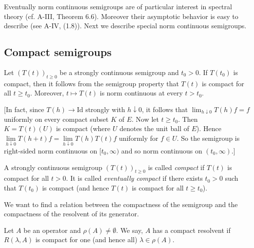 Eventually norm continuous semigroups are of particular interest in spectral theory (cf. A-III, Theorem 6.6).
Moreover their asymptotic behavior is easy to describe (see A-IV, (1.8)).
Next we describe special norm continuous semigroups.
\subsection{Compact semigroups} \label{subsec:a2-1.se7}

Let $(T(t))_{t\geq 0}$ be a strongly continuous semigroup and $t_0 > 0$.
If $T(t_0)$ is compact, then it follows from the semigroup property that $T(t)$ is compact for all $t \geq t_0$.
Moreover, $t \mapsto T(t)$ is norm continuous at every $t > t_0$.

[In fact, since $T(h) \to \text{Id}$ strongly with $h \downarrow 0$, it follows that $\lim_{h \downarrow 0} T(h)f = f$ uniformly on every compact subset $K$ of $E$.
Now let $t \geq t_0$.
Then $K = T(t)(U)$ is compact (where $U$ denotes the unit ball of $E$).
Hence $\lim \limits_{h \downarrow 0} T(h+t)f = \lim \limits_{h \downarrow 0} T(h)T(t)f$ uniformly for $f \in U$.
So the semigroup is right-sided norm continuous on $[t_0,\infty)$ and so norm continuous on $(t_0,\infty)$.]

\begin{definition}\label{def:a2-1.22}
A strongly continuous semigroup $(T(t))_{t\geq 0}$ is called \emph{compact} if $T(t)$ is compact for all $t > 0$. It is called \emph{eventually compact} if there exists $t_0 > 0$ such that $T(t_0)$ is compact (and hence $T(t)$ is compact for all $t \geq t_0$).
\end{definition}

We want to find a relation between the compactness of the semigroup and the compactness of the resolvent of its generator.

\begin{definition}\label{def:a2-1.23}
Let $A$ be an operator and $\rho(A) \neq \emptyset$.
We say, $A$ has a compact resolvent if $R(\lambda,A)$ is compact for one (and hence all) $\lambda \in \rho(A)$.
\end{definition}

